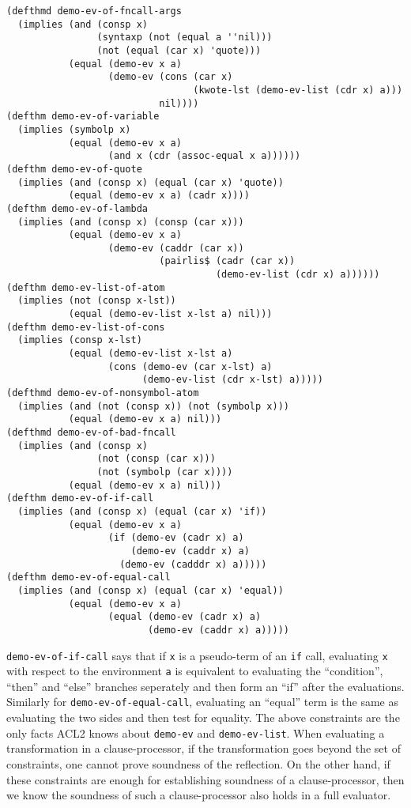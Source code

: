 \begin{lstlisting}[style=lisp]
(defthmd demo-ev-of-fncall-args
  (implies (and (consp x)
                (syntaxp (not (equal a ''nil)))
                (not (equal (car x) 'quote)))
           (equal (demo-ev x a)
                  (demo-ev (cons (car x)
                                 (kwote-lst (demo-ev-list (cdr x) a)))
                           nil))))
(defthm demo-ev-of-variable
  (implies (symbolp x)
           (equal (demo-ev x a)
                  (and x (cdr (assoc-equal x a))))))
(defthm demo-ev-of-quote
  (implies (and (consp x) (equal (car x) 'quote))
           (equal (demo-ev x a) (cadr x))))
(defthm demo-ev-of-lambda
  (implies (and (consp x) (consp (car x)))
           (equal (demo-ev x a)
                  (demo-ev (caddr (car x))
                           (pairlis$ (cadr (car x))
                                     (demo-ev-list (cdr x) a))))))
(defthm demo-ev-list-of-atom
  (implies (not (consp x-lst))
           (equal (demo-ev-list x-lst a) nil)))
(defthm demo-ev-list-of-cons
  (implies (consp x-lst)
           (equal (demo-ev-list x-lst a)
                  (cons (demo-ev (car x-lst) a)
                        (demo-ev-list (cdr x-lst) a)))))
(defthmd demo-ev-of-nonsymbol-atom
  (implies (and (not (consp x)) (not (symbolp x)))
           (equal (demo-ev x a) nil)))
(defthmd demo-ev-of-bad-fncall
  (implies (and (consp x)
                (not (consp (car x)))
                (not (symbolp (car x))))
           (equal (demo-ev x a) nil)))
(defthm demo-ev-of-if-call
  (implies (and (consp x) (equal (car x) 'if))
           (equal (demo-ev x a)
                  (if (demo-ev (cadr x) a)
                      (demo-ev (caddr x) a)
                    (demo-ev (cadddr x) a)))))
(defthm demo-ev-of-equal-call
  (implies (and (consp x) (equal (car x) 'equal))
           (equal (demo-ev x a)
                  (equal (demo-ev (cadr x) a)
                         (demo-ev (caddr x) a)))))
\end{lstlisting}

\texttt{demo-ev-of-if-call} says that if \texttt{x} is a pseudo-term of an
\texttt{if} call, evaluating \texttt{x} with respect to the environment
\texttt{a} is equivalent to evaluating the ``condition'', ``then'' and ``else''
branches seperately and then form an ``if'' after the evaluations.
Similarly for \texttt{demo-ev-of-equal-call}, evaluating an ``equal'' term is
the same as evaluating the two sides and then test for equality.
The above constraints are the only facts ACL2 knows about \texttt{demo-ev} and
\texttt{demo-ev-list}. When evaluating a transformation in a clause-processor,
if the transformation goes beyond the set of constraints, one cannot prove
soundness of the reflection. On the other hand, if these constraints are enough
for establishing soundness of a clause-processor, then we know the soundness of
such a clause-processor also holds in a full evaluator.

